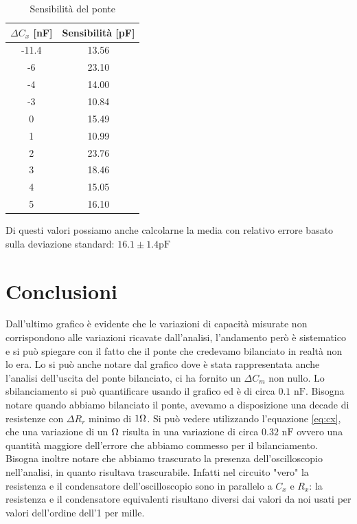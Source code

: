 \documentclass[12pt,]{article}
\begin{document}
\begin{table}[H]
\centering
\begin{tabular}{c|c}
\toprule
$\Delta C_x$ [nF] & Sensibilità [pF]\\
\midrule
\rowcolor{black!20}-11.4&13.56 \\
-6&23.10\\
\rowcolor{black!20}-4&14.00\\
-3&10.84\\
\rowcolor{black!20}0&15.49\\
1&10.99\\
\rowcolor{black!20}2&23.76\\
3&18.46\\
\rowcolor{black!20}4&15.05\\
5&16.10\\
\bottomrule
\end{tabular}
\caption{Sensibilità del ponte}
\end{table}
Di questi valori possiamo anche calcolarne la media con relativo errore basato sulla deviazione standard: $16.1 \pm 1.4 \text{pF}$
\section{Conclusioni}
Dall'ultimo grafico è evidente che le variazioni di capacità misurate non corrispondono alle variazioni ricavate dall'analisi, l'andamento però è sistematico e si può spiegare con il fatto che il ponte che credevamo bilanciato in realtà non lo era. Lo si può anche notare dal grafico dove è stata rappresentata anche l'analisi dell'uscita del ponte bilanciato, ci ha fornito un $\Delta C_m$ non nullo. Lo sbilanciamento si può quantificare usando il grafico ed è di circa $0.1 \text{ nF}$. Bisogna notare quando abbiamo bilanciato il ponte, avevamo a disposizione una decade di resistenze con $\Delta R_r$ minimo di $1 \ohm$. Si può vedere utilizzando l'equazione \eqref{eq:cx}, che una variazione di un $\ohm$ risulta in una variazione di circa $0.32 \text{ nF}$ ovvero una quantità maggiore dell'errore che abbiamo commesso per il bilanciamento.\\
Bisogna inoltre notare che abbiamo trascurato la presenza dell'oscilloscopio nell'analisi, in quanto risultava trascurabile. Infatti nel circuito "vero" la resistenza e il condensatore dell'oscilloscopio sono in parallelo a $C_x$ e $R_x$: la resistenza e il condensatore equivalenti risultano diversi dai valori da noi usati per valori dell'ordine dell'1 per mille. 
\end{document}
